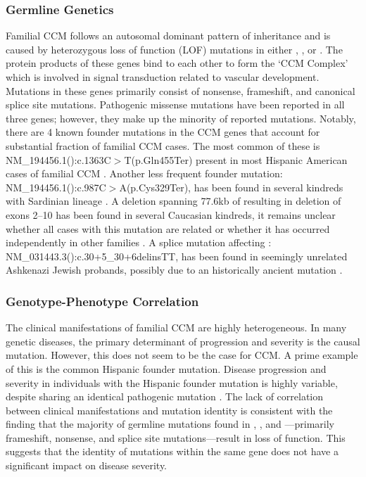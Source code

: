 \subsubsection{Germline Genetics}
Familial CCM follows an autosomal dominant pattern of inheritance \citep{bicknell1978, clark1970, kidd1947} and is caused by heterozygous loss of function (LOF) mutations in either  \citep{labergelecouteulx1999, sahoo1999},  \citep{liquori2003, denier2004}, or  \citep{bergametti2005}. The protein products of these genes bind to each other to form the `CCM Complex' which is involved in signal transduction related to vascular development. Mutations in these genes primarily consist of nonsense, frameshift, and canonical splice site mutations. Pathogenic missense mutations have been reported in all three genes; however, they make up the minority of reported mutations. Notably, there are 4 known founder mutations in the CCM genes that account for substantial fraction of familial CCM cases. The most common of these is NM\_194456.1():c.1363C$>$T(p.Gln455Ter) present in most Hispanic American cases of familial CCM \citep{gunel1996, sahoo1999}. Another less frequent  founder mutation: NM\_194456.1():c.987C$>$A(p.Cys329Ter), has been found in several kindreds with Sardinian lineage \citep{cau2009}. A deletion spanning 77.6kb of  resulting in deletion of exons 2--10 has been found in several Caucasian kindreds, it remains unclear whether all cases with this mutation are related or whether it has occurred independently in other families \citep{liquori2007, gallione2022}. A splice mutation affecting : NM\_031443.3():c.30+5\_30+6delinsTT, has been found in seemingly unrelated Ashkenazi Jewish probands, possibly due to an historically ancient mutation \citep{gallione2011}.

\subsubsection{Genotype-Phenotype Correlation}
The clinical manifestations of familial CCM are highly heterogeneous. In many genetic diseases, the primary determinant of progression and severity is the causal mutation. However, this does not seem to be the case for CCM. A prime example of this is the common Hispanic founder mutation. Disease progression and severity in individuals with the Hispanic founder mutation is highly variable, despite sharing an identical pathogenic mutation \citep{gault2006, laurans2003, denier2004, gianfrancesco2007}. The lack of correlation between clinical manifestations and mutation identity is consistent with the finding that the majority of germline mutations found in , , and ---primarily frameshift, nonsense, and splice site mutations---result in loss of function. This suggests that the identity of mutations within the same gene does not have a significant impact on disease severity.

